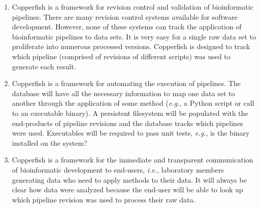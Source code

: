 \documentclass[11pt]{article}
\begin{document}
\begin{enumerate}

\item Copperfish is a framework for revision control and validation of bioinformatic pipelines.  There are many revision control systems available for software development.  However, none of these systems can track the application of bioinformatic pipelines to data sets.  It is very easy for a single raw data set to proliferate into numerous processed versions.  Copperfish is designed to track which pipeline (comprised of revisions of different scripts) was used to generate each result.  

\item Copperfish is a framework for automating the execution of pipelines.  The database will have all the necessary information to map one data set to another through the application of some method (\textit{e.g.}, a Python script or call to an executable binary).  A persistent filesystem will be populated with the end-products of pipeline revisions and the database tracks which pipelines were used.  Executables will be required to pass unit tests, \textit{e.g.}, is the binary installed on the system?  

\item Copperfish is a framework for the immediate and transparent communication of bioinformatic development to end-users, \textit{i.e.}, laboratory members generating data who need to apply methods to their data.  It will always be clear how data were analyzed because the end-user will be able to look up which pipeline revision was used to process their raw data.

\end{enumerate}
\end{document}
